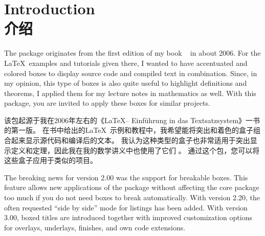 
\section{Introduction\\介绍}%
%




The package originates from %
the first edition of my book %
\frqq~%
in about 2006.%
For the \LaTeX\ examples and tutorials given there, %
I wanted to have accentuated and colored boxes to display source code and
compiled text in combination.%
Since, in my opinion, %
this type of boxes is also quite useful to highlight definitions and theorems,%
I applied them for my lecture notes in mathematics %
as well.%
With this package, you are invited to apply these boxes for similar projects.

该包起源于我在2006年左右的《\LaTeX -- Einführung in das Textsatzsystem》一书的第一版。
在书中给出的\LaTeX\ 示例和教程中，我希望能将突出和着色的盒子组合起来显示源代码和编译后的文本。
我认为这种类型的盒子也非常适用于突出显示定义和定理，因此我在我的数学讲义中也使用了它们%
。
通过这个包，您可以将这些盒子应用于类似的项目。



The breaking news for version 2.00 was the support for breakable boxes.%
This feature allows new applications of the package without affecting the core package too much if you do not need boxes to break automatically.%
With version 2.20, the often requested \enquote{side by side} mode for listings has been added.%
With version 3.00, boxed titles are introduced together with improved customization options for overlays, underlays, finishes, and own code extensions.%


